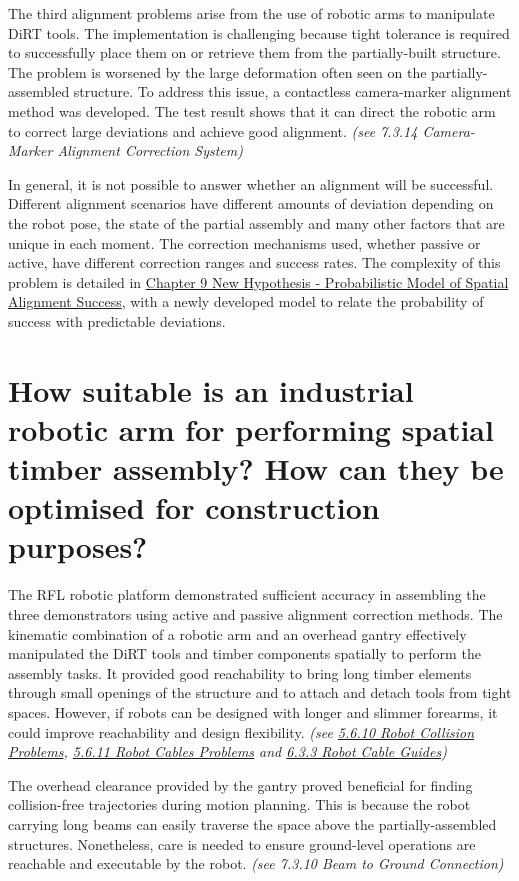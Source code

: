 \documentclass[11pt]{book}
\begin{document}
The third alignment problems arise from the use of robotic arms to manipulate DiRT tools. The implementation is challenging because tight tolerance is required to successfully place them on or retrieve them from the partially-built structure. The problem is worsened by the large deformation often seen on the partially-assembled structure. To address this issue, a contactless camera-marker alignment method was developed. The test result shows that it can direct the robotic arm to correct large deviations and achieve good alignment. \textit{(see 7.3.14 Camera-Marker Alignment Correction System)}

In general, it is not possible to answer whether an alignment will be successful. Different alignment scenarios have different amounts of deviation depending on the robot pose, the state of the partial assembly and many other factors that are unique in each moment. The correction mechanisms used, whether passive or active, have different correction ranges and success rates. The complexity of this problem is detailed in \uline{Chapter 9 New Hypothesis - Probabilistic Model of Spatial Alignment Success}, with a newly developed model to relate the probability of success with predictable deviations.

\section{How suitable is an industrial robotic arm for performing spatial timber assembly? How can they be optimised for construction purposes?}

The RFL robotic platform demonstrated sufficient accuracy in assembling the three demonstrators using active and passive alignment correction methods. The kinematic combination of a robotic arm and an overhead gantry effectively manipulated the DiRT tools and timber components spatially to perform the assembly tasks. It provided good reachability to bring long timber elements through small openings of the structure and to attach and detach tools from tight spaces. However, if robots can be designed with longer and slimmer forearms, it could improve reachability and design flexibility. \textit{(see \uline{5.6.10 Robot Collision Problems}, \uline{5.6.11 Robot Cables Problems} and \uline{6.3.3 Robot Cable Guides})}

The overhead clearance provided by the gantry proved beneficial for finding collision-free trajectories during motion planning. This is because the robot carrying long beams can easily traverse the space above the partially-assembled structures. Nonetheless, care is needed to ensure ground-level operations are reachable and executable by the robot. \textit{(see 7.3.10 Beam to Ground Connection)}
\end{document}
